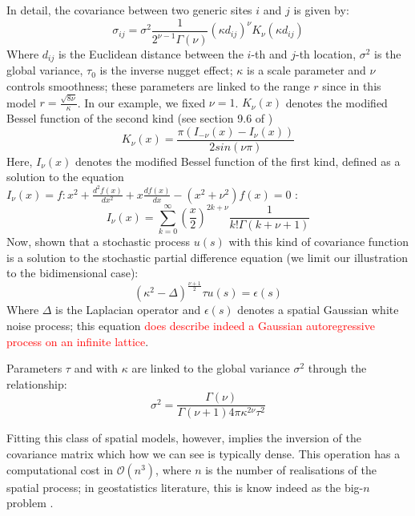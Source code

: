 \documentclass{book}
\begin{document}
In detail, the covariance between two generic sites $i$ and $j$ is given by:
\begin{equation}
\sigma_{ij} =\sigma^2 \frac{1}{2^{\nu-1}\Gamma(\nu)} \left(\kappa  d_{ij}\right)^{\nu}
K_{\nu}(\kappa d_{ij}) 
\end{equation}
Where $d_{ij}$ is the Euclidean distance between the $i$-th and $j$-th location, $\sigma^2$ is the global variance, $\tau_0$ is the inverse nugget effect; $\kappa$ is a scale parameter and $\nu$ controls smoothness; these parameters are linked to the range $r $ since in this model $r = \frac{\sqrt{8\nu}}{\kappa}$. In our example, we fixed $\nu = 1$. $K_{\nu}(x)$ denotes the modified Bessel function of the second kind (see section 9.6 of \cite{AS})
$$
K_{\nu}(x) = \frac{\pi \left( I_{-\nu}(x) - I_{\nu}(x)\right)}{2 sin (\nu \pi)}
$$
Here, $I_{\nu}(x)$ denotes the modified Bessel function of the first kind, defined as a solution to the equation $I_\nu(x) = f:x^2 + \frac{d^2f(x)}{dx^2}+x\frac{df(x)}{dx} - (x^2+\nu^2)f(x) = 0$
:
$$
I_{\nu}(x) = \sum_{k=0}^\infty \left( \frac{x}{2} \right)^{2k+\nu}\frac{1}{k! \Gamma(k+\nu+1)}
$$
Now, \cite{Whittle} shown that a stochastic process $u(s)$ with this kind of covariance function is a solution to the stochastic partial difference equation (we limit our illustration to the bidimensional case):
\begin{equation}
(\kappa^2 - \Delta)^{\frac{\nu + 1}{2}} \tau u(s) = \epsilon(s)
\label{spde}
\end{equation}
Where $\Delta$ is the Laplacian operator and $\epsilon(s)$ denotes a spatial Gaussian white noise process; this equation \textcolor{red}{does describe indeed a Gaussian autoregressive process on an infinite lattice}.

Parameters $\tau$ and with $\kappa$ are linked to the global variance $\sigma^2$ through the relationship:
$$
\sigma^2 = \frac{\Gamma(\nu)}{\Gamma(\nu +1) 4 \pi \kappa^{2 \nu} \tau^2}
$$

Fitting this class of spatial models, however, implies the inversion of the covariance matrix which how we can see is typically dense. This operation has a computational cost in $\mathcal{O}(n^3)$, where $n$ is the number of realisations of the spatial process; in geostatistics literature, this is know indeed as the big-$n$ problem \cite{bigN}. 
\end{document}
